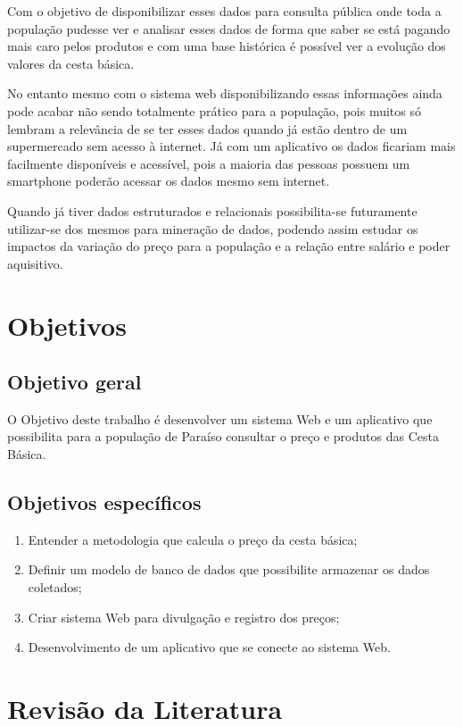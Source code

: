 \documentclass{ifto-tex}
\begin{document}
		Com o objetivo de disponibilizar esses dados para consulta pública onde toda a população pudesse ver e analisar esses dados de forma que saber se está pagando mais caro pelos produtos e com uma base histórica é possível ver a evolução dos valores da cesta básica.
		
		No entanto mesmo com o sistema web disponibilizando essas informações ainda pode acabar não sendo totalmente prático para a população, pois muitos só lembram a relevância de se ter esses dados quando já estão dentro de um supermercado sem acesso à  internet. Já com um aplicativo os dados ficariam mais facilmente disponíveis e acessível, pois a maioria das pessoas possuem um smartphone poderão acessar os dados mesmo sem internet.
		
		Quando já tiver dados estruturados e relacionais possibilita-se futuramente utilizar-se dos mesmos para mineração de dados, podendo assim estudar os impactos da variação do preço para a população e a relação entre salário e poder aquisitivo.
		
	
\chapter{Objetivos}
	
	\section{Objetivo geral}
	
		O Objetivo deste trabalho é desenvolver um sistema Web e um aplicativo que possibilita para a população de Paraíso consultar o preço e produtos das Cesta Básica.
	
	\section{Objetivos específicos}
	
		\begin{enumerate}
			\item Entender a metodologia que calcula o preço da cesta básica;
			\item Definir um modelo de banco de dados que possibilite armazenar os dados coletados;
			\item Criar sistema Web para divulgação e registro dos preços;
			\item Desenvolvimento de um aplicativo que se conecte ao sistema Web.
		\end{enumerate}

\chapter{Revisão da Literatura}
\end{document}
